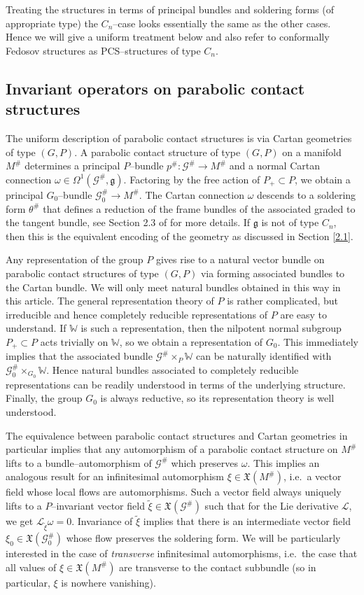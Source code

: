 \documentclass[12pt,a4paper]{amsart}
\def\frak{\mathfrak}
\def\Bbb{\mathbb}
\def\Cal{\mathcal}
\newcommand{\x}{\times}
\newcommand{\om}{\omega}
\renewcommand{\th}{\theta}
\newcommand{\Om}{\Omega}
\numberwithin{theorem}{section}
\theoremstyle{definition}
\theoremstyle{remark}
\begin{document}
Treating the structures in terms of principal bundles and soldering
forms (of appropriate type) the $C_n$--case looks essentially the same
as the other cases. Hence we will give a uniform treatment below and
also refer to conformally Fedosov structures as PCS--structures of
type $C_n$.

\subsection{Invariant operators on parabolic contact
  structures}\label{2.2} 

The uniform description of parabolic contact structures is via Cartan
geometries of type $(G,P)$. A parabolic contact structure of type
$(G,P)$ on a manifold $M^\#$ determines a principal $P$--bundle
$p^\#:\Cal G^\#\to M^\#$ and a normal Cartan connection
$\om\in\Om^1(\Cal G^\#,\frak g)$. Factoring by the free action of
$P_+\subset P$, we obtain a principal $G_0$--bundle $\Cal G_0^\#\to
M^\#$. The Cartan connection $\om$ descends to a soldering form
$\th^\#$ that defines a reduction of the frame bundles of
the associated graded to the tangent bundle, see Section 2.3 of
\cite{PCS2} for more details. If $\frak g$ is not of type $C_n$, then
this is the equivalent encoding of the geometry as discussed in
Section \ref{2.1}.

Any representation of the group $P$ gives rise to a natural vector
bundle on parabolic contact structures of type $(G,P)$ via forming
associated bundles to the Cartan bundle. We will only meet natural
bundles obtained in this way in this article. The general
representation theory of $P$ is rather complicated, but irreducible
and hence completely reducible representations of $P$ are easy to
understand. If $\Bbb W$ is such a representation, then the nilpotent
normal subgroup $P_+\subset P$ acts trivially on $\Bbb W$, so we
obtain a representation of $G_0$. This
immediately implies that the associated bundle $\Cal G^\#\x_P\Bbb W$
can be naturally identified with $\Cal G_0^\#\x_{G_0}\Bbb W$. Hence
natural bundles associated to completely reducible representations can
be readily understood in terms of the underlying structure. Finally,
the group $G_0$ is always reductive, so its representation theory is
well understood.

The equivalence between parabolic contact structures and Cartan
geometries in particular implies that any automorphism of a parabolic
contact structure on $M^\#$ lifts to a bundle--automorphism of $\Cal
G^\#$ which preserves $\om$. This implies an analogous result for an
infinitesimal automorphism $\xi\in\frak X(M^\#)$, i.e.~a vector field
whose local flows are automorphisms. Such a vector field always
uniquely lifts to a $P$--invariant vector field $\tilde\xi\in\frak
X(\Cal G^\#)$ such that for the Lie derivative $\Cal L$, we get $\Cal
L_{\tilde\xi}\om=0$. Invariance of $\tilde\xi$ implies that there is
an intermediate vector field $\xi_0\in\frak X(\Cal G^\#_0)$ whose flow
preserves the soldering form. We will be particularly interested in
the case of \textit{transverse} infinitesimal automorphisms, i.e.~the
case that all values of $\xi\in\frak X(M^\#)$ are transverse to the
contact subbundle (so in particular, $\xi$ is nowhere vanishing). 
\end{document}

